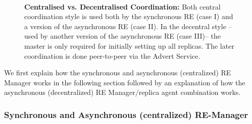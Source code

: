 \documentclass{rspublic}
\newcommand{\jhanote}[1]{ {\textcolor{red} { ***shantenu: #1 }}}
\newcommand{\jhanote}[1]{}
\begin{document}
\begin{figure}%
\centering
{}\qquad
{}\\
\caption{\textbf{Centralised vs. Decentralised Coordination:} Both
  central coordination style is used both by the synchronous RE (case
  I) and a version of the asynchronous RE (case II).  In the decentral
  style -- used by another version of the asynchronous RE (case III)--
  the master is only required for initially setting up all
  replicas. The later coordination is done peer-to-peer via the Advert
  Service.}
\label{fig:coordination}
\end{figure}


We first explain how the synchronous and asynchronous (centralized) RE
Manager works in the following section followed by an explanation of
how the asynchronous (decentralized) RE Manager/replica agent
combination works.

\subsubsection{Synchronous and Asynchronous (centralized) RE-Manager}
\end{document}
